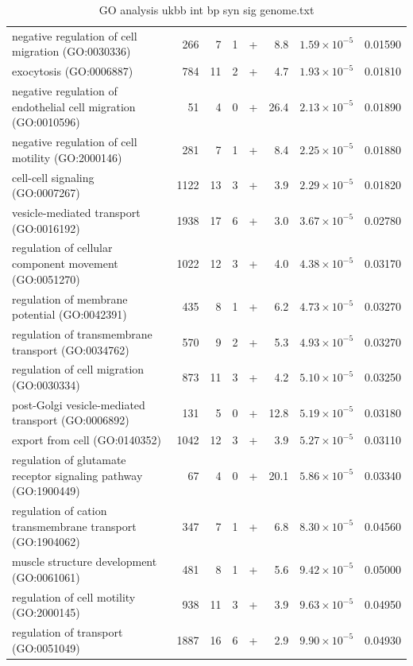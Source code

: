\begin{table}[ht]
\begin{adjustbox}{width=\textwidth}
\begin{tabular}{lrrrlrrr}
  negative regulation of cell migration (GO:0030336) & 266 & 7 & 1 & + & 8.8 & $1.59 \times 10^{-5}$ & 0.01590 \\ 
  exocytosis (GO:0006887) & 784 & 11 & 2 & + & 4.7 & $1.93 \times 10^{-5}$ & 0.01810 \\ 
  negative regulation of endothelial cell migration (GO:0010596) & 51 & 4 & 0 & + & 26.4 & $2.13 \times 10^{-5}$ & 0.01890 \\ 
  negative regulation of cell motility (GO:2000146) & 281 & 7 & 1 & + & 8.4 & $2.25 \times 10^{-5}$ & 0.01880 \\ 
  cell-cell signaling (GO:0007267) & 1122 & 13 & 3 & + & 3.9 & $2.29 \times 10^{-5}$ & 0.01820 \\ 
  vesicle-mediated transport (GO:0016192) & 1938 & 17 & 6 & + & 3.0 & $3.67 \times 10^{-5}$ & 0.02780 \\ 
  regulation of cellular component movement (GO:0051270) & 1022 & 12 & 3 & + & 4.0 & $4.38 \times 10^{-5}$ & 0.03170 \\ 
  regulation of membrane potential (GO:0042391) & 435 & 8 & 1 & + & 6.2 & $4.73 \times 10^{-5}$ & 0.03270 \\ 
  regulation of transmembrane transport (GO:0034762) & 570 & 9 & 2 & + & 5.3 & $4.93 \times 10^{-5}$ & 0.03270 \\ 
  regulation of cell migration (GO:0030334) & 873 & 11 & 3 & + & 4.2 & $5.10 \times 10^{-5}$ & 0.03250 \\ 
  post-Golgi vesicle-mediated transport (GO:0006892) & 131 & 5 & 0 & + & 12.8 & $5.19 \times 10^{-5}$ & 0.03180 \\ 
  export from cell (GO:0140352) & 1042 & 12 & 3 & + & 3.9 & $5.27 \times 10^{-5}$ & 0.03110 \\ 
  regulation of glutamate receptor signaling pathway (GO:1900449) & 67 & 4 & 0 & + & 20.1 & $5.86 \times 10^{-5}$ & 0.03340 \\ 
  regulation of cation transmembrane transport (GO:1904062) & 347 & 7 & 1 & + & 6.8 & $8.30 \times 10^{-5}$ & 0.04560 \\ 
  muscle structure development (GO:0061061) & 481 & 8 & 1 & + & 5.6 & $9.42 \times 10^{-5}$ & 0.05000 \\ 
  regulation of cell motility (GO:2000145) & 938 & 11 & 3 & + & 3.9 & $9.63 \times 10^{-5}$ & 0.04950 \\ 
  regulation of transport (GO:0051049) & 1887 & 16 & 6 & + & 2.9 & $9.90 \times 10^{-5}$ & 0.04930 \\ 
   \hline
\end{tabular}
\end{adjustbox}
\caption{GO analysis ukbb int bp syn sig genome.txt} 
\label{tab:GO analysis ukbb_int_bp_syn_sig_genome.txt}
\end{table}

